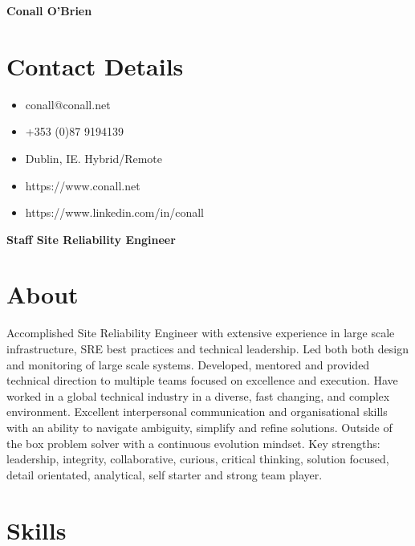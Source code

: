 \documentclass[a4paper, 10pt] {article}
\begin{document}
\begingroup
  \centering
  \LARGE \textbf{Conall O'Brien}\\[1.5em]
\endgroup

\hrulefill

\section*{Contact Details}

\small
\begin{multicols}{2}
  \begin{itemize}[noitemsep]
    \item conall@conall.net
    \item +353 (0)87 9194139
    \item Dublin, IE. Hybrid/Remote
    \item https://www.conall.net
    \item https://www.linkedin.com/in/conall
  \end{itemize}
\end{multicols}
\normalsize

\begingroup
  \centering
  \large \textbf{Staff Site Reliability Engineer}\\[1em]
\endgroup

\hrulefill

\section*{About}

Accomplished Site Reliability Engineer with extensive experience in
large scale infrastructure, SRE best practices and technical leadership.
Led both both design and monitoring of large scale systems.
Developed, mentored and provided technical direction to multiple teams
focused on excellence and execution. Have worked in a global technical
industry in a diverse, fast changing, and complex environment. Excellent
interpersonal communication and organisational skills with an ability to
navigate ambiguity, simplify and refine solutions. Outside of the box
problem solver with a continuous evolution mindset. Key strengths:
leadership, integrity, collaborative, curious, critical thinking, solution
focused, detail orientated, analytical, self starter and strong team player.

\section*{Skills}
\end{document}
